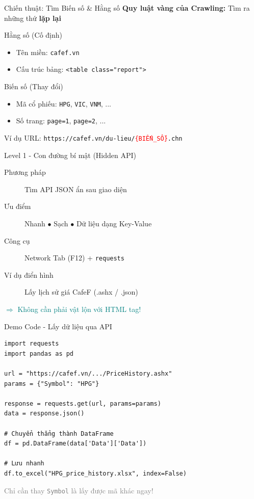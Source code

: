 \documentclass[10pt]{beamer}
\begin{document}
\begin{frame}{Chiến thuật: Tìm Biến số \& Hằng số}
  \textbf{Quy luật vàng của Crawling:} Tìm ra những thứ \textbf{lặp lại}

  \vspace{0.8em}
  \begin{block}{Hằng số (Cố định)}
    \begin{itemize}
      \item Tên miền: \texttt{cafef.vn}
      \item Cấu trúc bảng: \texttt{<table class="report">}
    \end{itemize}
  \end{block}

  \begin{block}{Biến số (Thay đổi)}
    \begin{itemize}
      \item Mã cổ phiếu: \texttt{HPG}, \texttt{VIC}, \texttt{VNM}, ...
      \item Số trang: \texttt{page=1}, \texttt{page=2}, ...
    \end{itemize}
  \end{block}

  \vspace{1em}
  \centering
  \Large Ví dụ URL: \texttt{https://cafef.vn/du-lieu/\textcolor{red}{\{BIẾN\_SỐ\}}.chn}
\end{frame}

\begin{frame}{Level 1 - Con đường bí mật (Hidden API)}
  \begin{description}
    \item[Phương pháp] Tìm API JSON ẩn sau giao diện
    \item[Ưu điểm] Nhanh $\bullet$ Sạch $\bullet$ Dữ liệu dạng Key-Value
    \item[Công cụ] Network Tab (F12) + \texttt{requests}
    \item[Ví dụ điển hình] Lấy lịch sử giá CafeF (.ashx / .json)
  \end{description}

  \vspace{1em}
  \textcolor{teal}{\Large $\Rightarrow$ Không cần phải vật lộn với HTML tag!}
\end{frame}

\begin{frame}[fragile]{Demo Code - Lấy dữ liệu qua API}
\begin{lstlisting}
import requests
import pandas as pd

url = "https://cafef.vn/.../PriceHistory.ashx"
params = {"Symbol": "HPG"}

response = requests.get(url, params=params)
data = response.json()

# Chuyển thẳng thành DataFrame
df = pd.DataFrame(data['Data']['Data'])

# Lưu nhanh
df.to_excel("HPG_price_history.xlsx", index=False)
\end{lstlisting}

\footnotesize\textcolor{gray}{Chỉ cần thay \texttt{Symbol} là lấy được mã khác ngay!}
\end{frame}
\end{document}
